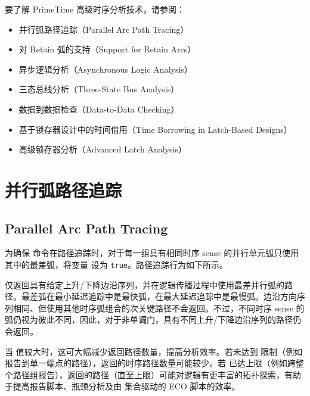 \label{chap:adv}

要了解 PrimeTime 高级时序分析技术，请参阅：
\begin{itemize}
  \item 并行弧路径追踪（Parallel Arc Path Tracing）
  \item 对 Retain 弧的支持（Support for Retain Arcs）
  \item 异步逻辑分析（Asynchronous Logic Analysis）
  \item 三态总线分析（Three-State Bus Analysis）
  \item 数据到数据检查（Data-to-Data Checking）
  \item 基于锁存器设计中的时间借用（Time Borrowing in Latch-Based Designs）
  \item 高级锁存器分析（Advanced Latch Analysis）
\end{itemize}

\section{并行弧路径追踪}
\subsection*{Parallel Arc Path Tracing}

为确保  命令在路径追踪时，对于每一组具有相同时序 sense 的并行单元弧只使用其中的最差弧，将变量  设为 \texttt{true}。路径追踪行为如下所示。


仅返回具有给定上升/下降边沿序列，并在逻辑传播过程中使用最差并行弧的路径。最差弧在最小延迟追踪中是最快弧，在最大延迟追踪中是最慢弧。边沿方向序列相同、但使用其他时序弧组合的次关键路径不会返回。不过，不同时序 sense 的弧仍视为彼此不同，因此，对于非单调门，具有不同上升/下降边沿序列的路径仍会返回。

当  值较大时，这可大幅减少返回路径数量，提高分析效率。若未达到  限制（例如报告到单一端点的路径），返回的时序路径数量可能较少。若  已达上限（例如跨整个路径组报告），返回的路径（直至上限）可能对逻辑有更丰富的拓扑探索，有助于提高报告脚本、瓶颈分析及由  集合驱动的 ECO 脚本的效率。

